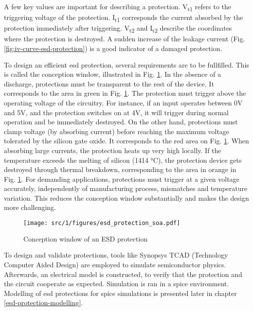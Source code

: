 A few key values are important for describing a protection.
V\textsubscript{t1} refers to the triggering voltage of the protection.
I\textsubscript{t1} corresponds the current absorbed by the protection immediately after triggering.
V\textsubscript{t2} and I\textsubscript{t2} describe the coordinates where the protection is destroyed.
A sudden increase of the leakage current (Fig. \ref{fig:iv-curve-esd-protection}) is a good indicator of a damaged protection.

To design an efficient \gls{esd} protection, several requirements are to be fullfilled.
This is called the conception window, illustrated in Fig. \ref{fig:soa-esd-protection}.
In the absence of a discharge, protections must be transparent to the rest of the device.
It corresponds to the area in green in Fig. \ref{fig:soa-esd-protection}.
The protection must trigger above the operating voltage of the circuitry.
For instance, if an input operates between 0V and 5V, and the protection switches on at 4V, it will trigger during normal operation and be immediately destroyed.
On the other hand, protections must clamp voltage (by absorbing current) before reaching the maximum voltage tolerated by the silicon gate oxide.
It corresponds to the red area on Fig. \ref{fig:soa-esd-protection}.
When absorbing large currents, the protection heats up very high locally.
If the temperature exceeds the melting of silicon (1414 °C), the protection device gets destroyed through thermal breakdown, corresponding to the area in orange in Fig. \ref{fig:soa-esd-protection}.
For demanding applications, protections must trigger at a given voltage accurately, independently of manufacturing process, mismatches and temperature variation.
This reduces the conception window substantially and makes the design more challenging.

\begin{figure}[!h]
  \centering
  \texttt{[image: src/1/figures/esd\_protection\_soa.pdf]}
  \caption{Conception window of an ESD protection}
  \label{fig:soa-esd-protection}
\end{figure}

To design and validate protections, tools like Synopsys TCAD (Technology Computer Aided Design) \cite{tcad} are employed to simulate semiconductor physics.
Afterwards, an electrical model is constructed, to verify that the protection and the circuit cooperate as expected.
Simulation is ran in a \gls{spice} environment.
Modelling of \gls{esd} protections for \gls{spice} simulations is presented later in chapter \ref{esd-protection-modelling}.
